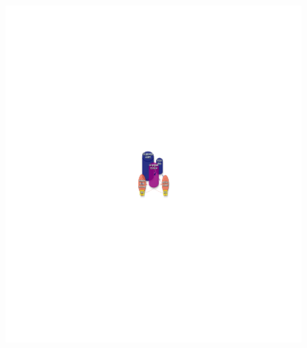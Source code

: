 \documentclass[
sn-nature
]{sn-jnl}
\begin{document}
\begin{figure}
\begin{minipage}{0.50\linewidth}
{\includegraphics{index_files/figure-pdf/fig-therapy-examples-2.pdf}

}


\end{minipage}%
\newline
\begin{minipage}{\linewidth}

\centering{

}
\end{minipage}
\end{figure}
\end{document}
